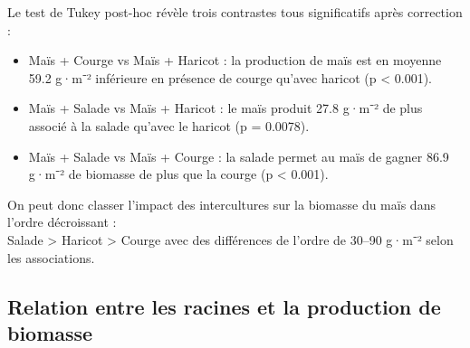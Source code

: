 \documentclass[
]{article}
\begin{document}
Le test de Tukey post-hoc révèle trois contrastes tous significatifs
après correction :

\begin{itemize}
\item
  Maïs + Courge vs Maïs + Haricot : la production de maïs est en moyenne
  59.2 g·m⁻² inférieure en présence de courge qu'avec haricot (p
  \textless{} 0.001).
\item
  Maïs + Salade vs Maïs + Haricot : le maïs produit 27.8 g·m⁻² de plus
  associé à la salade qu'avec le haricot (p = 0.0078).
\item
  Maïs + Salade vs Maïs + Courge : la salade permet au maïs de gagner
  86.9 g·m⁻² de biomasse de plus que la courge (p \textless{} 0.001).
\end{itemize}

On peut donc classer l'impact des intercultures sur la biomasse du maïs
dans l'ordre décroissant :\\
Salade \textgreater{} Haricot \textgreater{} Courge avec des différences
de l'ordre de 30--90 g·m⁻² selon les associations.

\subsection{Relation entre les racines et la production de
biomasse}\label{relation-entre-les-racines-et-la-production-de-biomasse}
\end{document}

